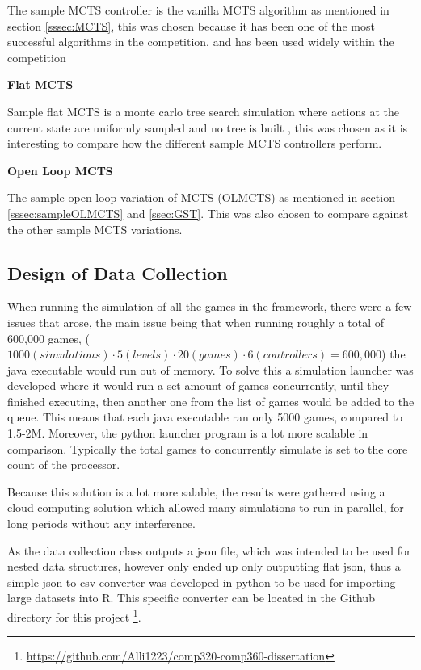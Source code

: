 \documentclass[journal]{IEEEtran}
\begin{document}
	The sample MCTS controller is the vanilla MCTS algorithm as mentioned in section \ref{sssec:MCTS}, this was chosen because it has been one of the most successful algorithms in the competition, and has been used widely within the competition \cite{perez20162014, perez2018general}

	\textbf{Flat MCTS}

	Sample flat MCTS is a monte carlo tree search simulation where actions at the current state are uniformly sampled and no tree is built \cite{browne2012survey}, this was chosen as it is interesting to compare how the different sample MCTS controllers perform.

	\textbf{Open Loop MCTS}

	The sample open loop variation of MCTS (OLMCTS) as mentioned in section \ref{sssec:sampleOLMCTS} and \ref{ssec:GST}. This was also chosen to compare against the other sample MCTS variations.

	
	

	\subsection{Design of Data Collection}
	
	When running the simulation of all the games in the framework, there were a few issues that arose, the main issue being that when running roughly a total of 600,000 games, ($ 1000(simulations) \cdot 5 (levels) \cdot 20 (games) \cdot 6 (controllers) = 600,000$) the java executable would run out of memory.
	To solve this a simulation launcher was developed where it would run a set amount of games concurrently, until they finished executing, then another one from the list of games would be added to the queue. This means that each java executable ran only 5000 games, compared to 1.5-2M. Moreover, the python launcher program is a lot more scalable in comparison.
	Typically the total games to concurrently simulate is set to the core count of the processor.

	Because this solution is a lot more salable, the results were gathered using a cloud computing solution which allowed many simulations to run in parallel, for long periods without any interference.
	

	As the data collection class outputs a json file, which was intended to be used for nested data structures, however only ended up only outputting flat json, thus a simple json to csv converter was developed in python to be used for importing large datasets into R. This specific converter can be located in the Github directory for this project \footnote{\url{https://github.com/Alli1223/comp320-comp360-dissertation}}.
\end{document}
